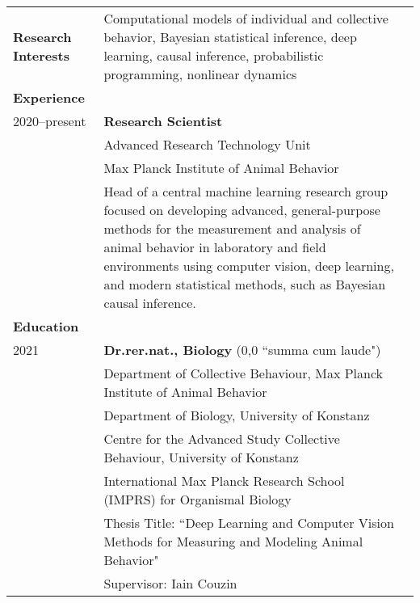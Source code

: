 \documentclass[letterpaper,10pt,oneside]{article}
\newcommand{\tabitem}{\hspace{2mm}\textbullet\hspace{2mm}}
\begin{document}
\begin{small}
\noindent \begin{longtable}{@{} l p{5in}l}

\large{\textbf{Research Interests}}
& Computational models of individual and collective behavior, Bayesian statistical inference, deep learning, causal inference, probabilistic programming, nonlinear dynamics \vspace{2mm}\\ 

\Large{\textbf{Experience}} \vspace{2mm} \\
\large{2020--present} 
& \textbf{Research Scientist} \\
& {Advanced Research Technology Unit} \\
& {Max Planck Institute of Animal Behavior} \\
& \tabitem Head of a central machine learning research group focused on developing advanced, general-purpose methods for the measurement and analysis of animal behavior in laboratory and field environments using computer vision, deep learning, and modern statistical methods, such as Bayesian causal inference.\vspace{5mm} \\

\Large{\textbf{Education}} \vspace{2mm} \\
 \large{2021} 
 & \textbf{Dr.rer.nat., Biology} (0,0 ``summa cum laude")\\
  &   {Department of Collective Behaviour, Max Planck Institute of Animal Behavior} \\
 &   {Department of Biology, University of Konstanz} \\
 &  {Centre for the Advanced Study Collective Behaviour, University of Konstanz} \\
 &   {International Max Planck Research School (IMPRS) for Organismal Biology} \\
 &  Thesis Title: ``Deep Learning and Computer Vision Methods for Measuring and Modeling Animal Behavior" \\
 & Supervisor: Iain Couzin \vspace{2mm}  \\


\end{longtable}
\end{small}
\end{document}

